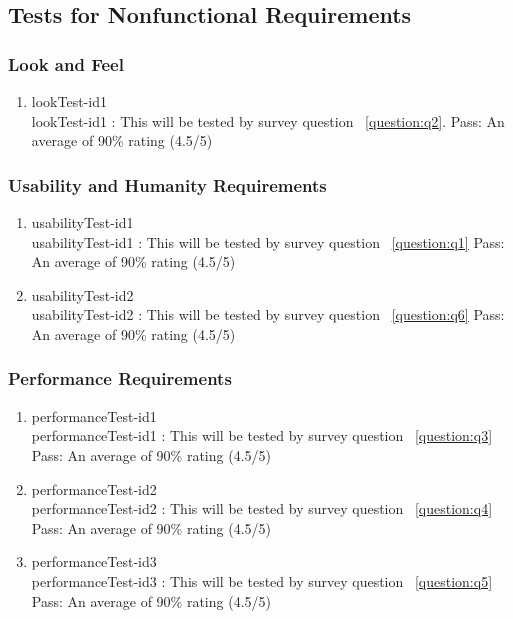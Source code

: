 \documentclass[12pt, titlepage]{article}
\begin{document}
\subsection{Tests for Nonfunctional Requirements}

\subsubsection{Look and Feel}
\begin{enumerate}
\item{lookTest-id1\\}
lookTest-id1 : This will be tested by survey question ~\ref{question:q2}.
\newline
	Pass: An average of 90\% rating (4.5/5)


\end{enumerate}


\subsubsection{Usability and Humanity Requirements}
\begin{enumerate}
\item{usabilityTest-id1\\}
usabilityTest-id1 : This will be tested by survey question ~\ref{question:q1}
\newline
	Pass: An average of 90\% rating (4.5/5)

\item{usabilityTest-id2\\}
usabilityTest-id2 : This will be tested by survey question ~\ref{question:q6}
\newline
	Pass: An average of 90\% rating (4.5/5)


\end{enumerate}

\subsubsection{Performance Requirements}
\begin{enumerate}
\item{performanceTest-id1\\}
performanceTest-id1 : This will be tested by survey question ~\ref{question:q3}
\newline
	Pass: An average of 90\% rating (4.5/5)


\item{performanceTest-id2\\}
performanceTest-id2 : This will be tested by survey question ~\ref{question:q4}
\newline
	Pass: An average of 90\% rating (4.5/5)

\item{performanceTest-id3\\}
performanceTest-id3 : This will be tested by survey question ~\ref{question:q5}
\newline
	Pass: An average of 90\% rating (4.5/5)


\end{enumerate}
\end{document}
